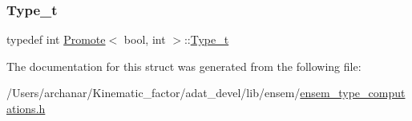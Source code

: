 \subsubsection{\texorpdfstring{Type\_t}{Type\_t}\hspace{0.1cm}{\footnotesize\ttfamily [2/2]}}
{\footnotesize\ttfamily typedef int \mbox{\hyperlink{structPromote}{Promote}}$<$ bool, int $>$\+::\mbox{\hyperlink{structPromote_3_01bool_00_01int_01_4_a7b27a2556c64a5b0f00d0a2fbac26b8a}{Type\+\_\+t}}}



The documentation for this struct was generated from the following file\+:\begin{DoxyCompactItemize}
\item 
/\+Users/archanar/\+Kinematic\+\_\+factor/adat\+\_\+devel/lib/ensem/\mbox{\hyperlink{lib_2ensem_2ensem__type__computations_8h}{ensem\+\_\+type\+\_\+computations.\+h}}\end{DoxyCompactItemize}
